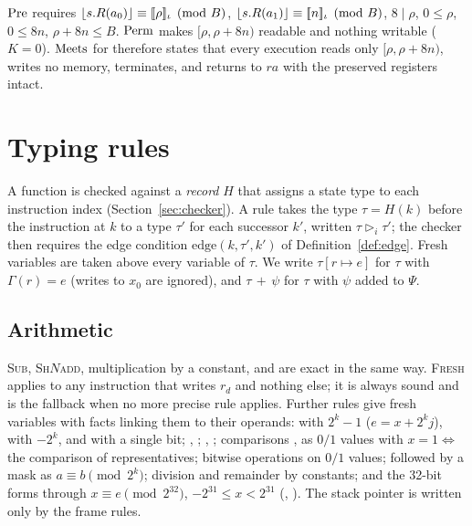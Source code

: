 \begin{example}\label{ex:meets}
$\mathrm{Pre}$ requires $\lfloor s.R(a_0)\rfloor\equiv[\![\rho]\!]_{\iota}\pmod B$, $\lfloor s.R(a_1)\rfloor\equiv[\![n]\!]_{\iota}\pmod B$, $8\mid\rho$, $0\le\rho$, $0\le 8n$, $\rho+8n\le B$. $\mathrm{Perm}$ makes $[\rho,\rho+8n)$ readable and nothing writable ($K=0$). $\mathrm{Meets}$ for  therefore states that every execution reads only $[\rho,\rho+8n)$, writes no memory, terminates, and returns to $\mathit{ra}$ with the preserved registers intact.
\end{example}

\section{Typing rules}\label{sec:rules}
A function is checked against a \emph{record} $H$ that assigns a state type to each instruction index (Section~\ref{sec:checker}). A rule takes the type $\tau=H(k)$ before the instruction at $k$ to a type $\tau'$ for each successor $k'$, written $\tau\triangleright_i\tau'$; the checker then requires the edge condition $\mathrm{edge}(k,\tau',k')$ of Definition~\ref{def:edge}. Fresh variables are taken above every variable of $\tau$. We write $\tau[r\mapsto e]$ for $\tau$ with $\Gamma(r)=e$ (writes to $x_0$ are ignored), and $\tau\,{+}\,\psi$ for $\tau$ with $\psi$ added to $\Psi$.

\subsection{Arithmetic}
\textsc{Sub}, \textsc{Sh$N$add}, multiplication by a constant, and  are exact in the same way. \textsc{Fresh} applies to any instruction that writes $r_d$ and nothing else; it is always sound and is the fallback when no more precise rule applies. Further rules give fresh variables with facts linking them to their operands:  with $2^k-1$ ($e=x+2^kj$), with $-2^k$, and with a single bit; , ; , ; comparisons ,  as $0/1$ values with $x=1\Leftrightarrow$ the comparison of representatives; bitwise operations on $0/1$ values;  followed by a mask as $a\equiv b\pmod{2^k}$; division and remainder by constants; and the 32-bit forms through $x\equiv e\pmod{2^{32}}$, $-2^{31}\le x<2^{31}$ (, ). The stack pointer is written only by the frame rules.

